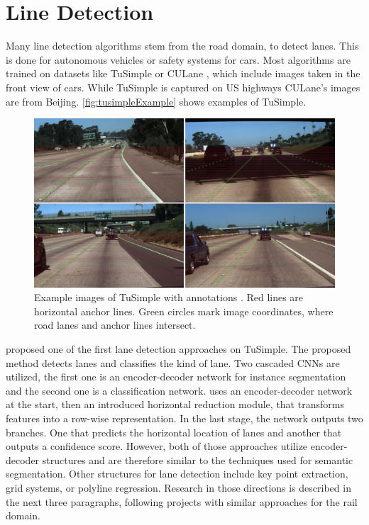 \section{Line Detection}
\label{sec:lineDetection}

Many line detection algorithms stem from the road domain, to detect lanes.
This is done for autonomous vehicles or safety systems for cars.
Most algorithms are trained on datasets like TuSimple \cite{tuSimpleDataset} or CULane \cite{cuLaneDataset}, which include images taken in the front view of cars.
While TuSimple is captured on US highways CULane's images are from Beijing.
\autoref{fig:tusimpleExample} shows examples of TuSimple.

\vspace{0.8cm}

\begin{figure}[H]
    \centering
    \includegraphics[width=\linewidth]{PICs/lineDetection/tusimple_example.jpg}
    \caption{Example images of TuSimple with annotations \cite{tuSimpleDatasetExampleImage}. Red lines are horizontal anchor lines. Green circles mark image coordinates, where road lanes and anchor lines intersect.}
    \label{fig:tusimpleExample}
\end{figure}

\vspace{0.8cm}

\noindent \cite{LaneDetectionCascadedCNNs2019} proposed one of the first lane detection approaches on TuSimple.
The proposed method detects lanes and classifies the kind of lane.
Two cascaded \ac{CNN}s are utilized, the first one is an encoder-decoder network for instance segmentation and the second one is a classification network.
\cite{rowwiseClassification2020} uses an encoder-decoder network at the start, then an introduced horizontal reduction module, that transforms features into a row-wise representation. In the last stage, the network outputs two branches. One that predicts the horizontal location of lanes and another that outputs a confidence score.
However, both of those approaches utilize encoder-decoder structures and are therefore similar to the techniques used for semantic segmentation.
Other structures for lane detection include key point extraction, grid systems, or polyline regression.
Research in those directions is described in the next three paragraphs, following projects with similar approaches for the rail domain.

